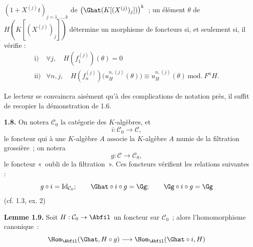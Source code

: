 \((1+X^{(j)}t)_{j=1,\ldots,k}\) de \(\bigl(\Ghat(K[(X^{(j)})_j])\bigr)^k\)~; un
élément \(\theta\) de \(H(K[(X^{(j)})_j])\) détermine un morphisme de foncteurs si, et seulement si, il vérifie :
\[
\begin{array}{ll}
\text{i)}& \forall j,\quad H(f_1^{(j)})(\theta)=0\\[0.3em]
\text{ii)}& \forall n,j,\quad
H(f_n^{(j)})\bigl(u_H^{n,(j)}(\theta)\bigr)
\equiv u_H^{n,(j)}(\theta)\ \mathrm{mod.}\ F^nH.
\end{array}
\]

Le lecteur se convaincra aisément qu'à des complications de notation près, il suffit de recopier la démonstration de 1.6.

\textbf{1.8.} On notera \(\mathcal C_0\) la catégorie des \(K\)-algèbres, et
\[
  i:\mathcal C_0\longrightarrow \mathcal C,
\]
le foncteur qui à une \(K\)-algèbre \(A\) associe la \(K\)-algèbre \(A\) munie de la filtration grossière~; on notera
\[
  g:\mathcal C\longrightarrow\mathcal C_0,
\]
le foncteur «~oubli de la filtration~». Ces foncteurs vérifient les relations suivantes :
\[
  g\circ i=\operatorname{Id}_{\mathcal C_0};\qquad
  \Ghat\circ i\circ g=\Gg;\qquad
  \Gg\circ i\circ g=\Gg
\]
(cf. 1.3, ex. 2)

\textbf{Lemme 1.9.} Soit \(H:\mathcal C_0\to\Abfil\) un foncteur sur \(\mathcal C_0\)~; alors l'homomorphisme canonique~:
\[
  \Hom_{\Abfil}(\Ghat,H\circ g)
  \longrightarrow
  \Hom_{\Abfil}(\Ghat\circ i,H)
\]
